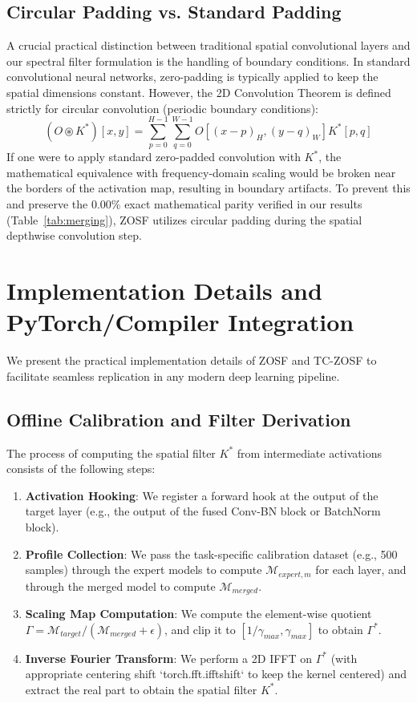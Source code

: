 \documentclass{article}
\theoremstyle{plain}
\theoremstyle{definition}
\theoremstyle{remark}
\begin{document}
\subsection{Circular Padding vs. Standard Padding}
A crucial practical distinction between traditional spatial convolutional layers and our spectral filter formulation is the handling of boundary conditions. In standard convolutional neural networks, zero-padding is typically applied to keep the spatial dimensions constant. However, the 2D Convolution Theorem is defined strictly for circular convolution (periodic boundary conditions):
\begin{equation}
    (O \circledast K^*)[x, y] = \sum_{p=0}^{H-1} \sum_{q=0}^{W-1} O[(x - p)_H, (y - q)_W] K^*[p, q]
\end{equation}
If one were to apply standard zero-padded convolution with $K^*$, the mathematical equivalence with frequency-domain scaling would be broken near the borders of the activation map, resulting in boundary artifacts. To prevent this and preserve the 0.00\% exact mathematical parity verified in our results (Table~\ref{tab:merging}), ZOSF utilizes circular padding during the spatial depthwise convolution step.

\section{Implementation Details and PyTorch/Compiler Integration}
\label{app:implementation}

We present the practical implementation details of ZOSF and TC-ZOSF to facilitate seamless replication in any modern deep learning pipeline.

\subsection{Offline Calibration and Filter Derivation}
The process of computing the spatial filter $K^*$ from intermediate activations consists of the following steps:
\begin{enumerate}
    \item \textbf{Activation Hooking}: We register a forward hook at the output of the target layer (e.g., the output of the fused Conv-BN block or BatchNorm block).
    \item \textbf{Profile Collection}: We pass the task-specific calibration dataset (e.g., 500 samples) through the expert models to compute $\mathcal{M}_{expert, m}$ for each layer, and through the merged model to compute $\mathcal{M}_{merged}$.
    \item \textbf{Scaling Map Computation}: We compute the element-wise quotient $\Gamma = \mathcal{M}_{target} / (\mathcal{M}_{merged} + \epsilon)$, and clip it to $[1/\gamma_{max}, \gamma_{max}]$ to obtain $\Gamma^*$.
    \item \textbf{Inverse Fourier Transform}: We perform a 2D IFFT on $\Gamma^*$ (with appropriate centering shift `torch.fft.ifftshift` to keep the kernel centered) and extract the real part to obtain the spatial filter $K^*$.
\end{enumerate}
\end{document}
